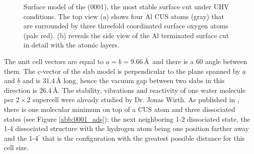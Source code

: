 \documentclass[11pt,DIV=13,BCOR=5mm,a4paper,headinclude]{scrbook}
\renewcommand{\vec}[1]{\underline{#1}}
\begin{document}
\begin{figure}[!ht]
 \centering
{}
 \quad\quad
 \caption{Surface model of the (0001), the most stable surface cut under UHV conditions.
The top view (a) shows four Al CUS atoms (gray) that are surrounded by three threefold coordinated surface oxygen atoms (pale red).
(b) reveals the side view of the Al terminated surface cut in detail with the atomic layers.}
        \label{abb:surf_0001}
\end{figure}
The unit cell vectors are equal to $\vec{a}=\vec{b}=9.66\,$\AA  ~and there is a $60$\textdegree{} angle between them.
The $\vec{c}$-vector of the slab model is perpendicular to the plane spanned by $\vec{a}$ and $\vec{b}$ and is $31.4\,$\AA{} long, hence the vacuum gap between two slabs in this direction is $26.4\,$\AA.
The stability, vibrations and reactivity of one water  molecule per $2\times 2$ supercell were already studied by Dr. Jonas Wirth.
As published in \cite{WirthJPCC2012}, there is one molecular minimum on top of a CUS atom and three dissociated states (see Figure \ref{abb:0001_ads}): the next neighboring 1-2 dissociated state, the 1-4 dissociated structure with the hydrogen atom being one position farther away and the 1-4$^\prime$ that is the configuration with the greatest possible distance for this cell size.
\end{document}
